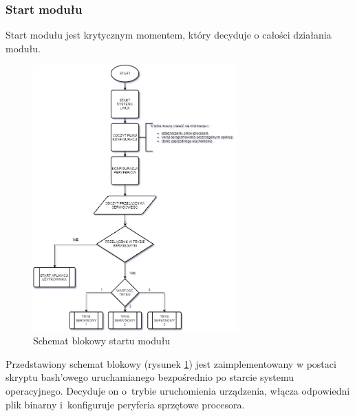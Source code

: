 \documentclass[12pt, eng, twoside, openany, final]{mgr}
\begin{document}
                    \subsubsection{Start modułu}
                    Start modułu jest krytycznym momentem, który decyduje o całości działania modułu.
                        \begin{figure}[H]
                        \begin{center}
                            \includegraphics[width=0.7\textwidth]{startup.png}
                            \caption{Schemat blokowy startu modułu} \label{fig:startup}
                        \end{center}
                        \end{figure}
                Przedstawiony schemat blokowy (rysunek \ref{fig:startup}) jest zaimplementowany w postaci skryptu bash'owego uruchamianego bezpośrednio po starcie systemu operacyjnego. Decyduje on o~trybie uruchomienia urządzenia, włącza odpowiedni plik binarny i~konfiguruje peryferia sprzętowe procesora.
                \newpage
                        
\end{document}
